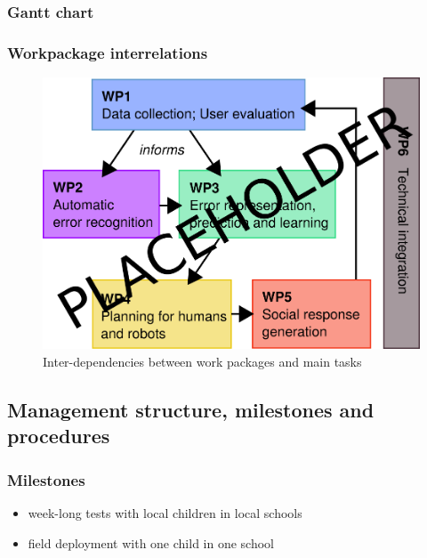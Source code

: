 \documentclass[]{article}
\begin{document}
\subsubsection{Gantt chart}\label{gantt-chart}

\begin{landscape}

\end{landscape}

\subsubsection{Workpackage interrelations}\label{workpackage-interrelations}

\begin{figure}[!htbp]
    \centering
    \includegraphics[width=0.8\linewidth]{figs/wp-interrelations}
    \caption{Inter-dependencies between work packages and main tasks}
    \label{}
\end{figure}



\subsection{Management structure, milestones and procedures}\label{management-structure-milestones-and-procedures}

\subsubsection{Milestones}\label{milestones}

\begin{itemize}

\item   week-long tests with local children in local schools
\item   field deployment with one child in one school
\end{itemize}
\end{document}

